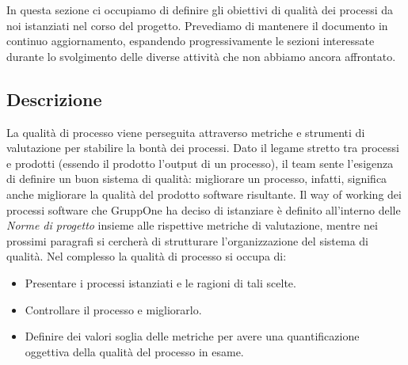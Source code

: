 \documentclass[../piano-di-qualifica.tex]{subfiles}
\begin{document}
In questa sezione ci occupiamo di definire gli obiettivi di qualità dei processi da noi istanziati nel corso del progetto.
Prevediamo di mantenere il documento in continuo aggiornamento, espandendo progressivamente le sezioni interessate durante lo svolgimento delle diverse attività che non abbiamo ancora affrontato.

\subsection{Descrizione}%
\label{sub:descrizione}

La qualità di processo viene perseguita attraverso metriche e strumenti di valutazione per stabilire la bontà dei processi.
Dato il legame stretto tra processi e prodotti (essendo il prodotto l'output di un processo), il team sente l'esigenza di definire un buon sistema di qualità: migliorare un processo, infatti, significa anche migliorare la qualità del prodotto software risultante.
Il way of working dei processi software che GruppOne ha deciso di istanziare è definito all'interno delle \textit{Norme di progetto} insieme alle rispettive metriche di valutazione, mentre nei prossimi paragrafi si cercherà di strutturare l'organizzazione del sistema di qualità.
Nel complesso la qualità di processo si occupa di:
\begin{itemize}
  \item Presentare i processi istanziati e le ragioni di tali scelte.
  \item Controllare il processo e migliorarlo.
  \item Definire dei valori soglia delle metriche per avere una quantificazione oggettiva della qualità del processo in esame.
\end{itemize}




\end{document}
